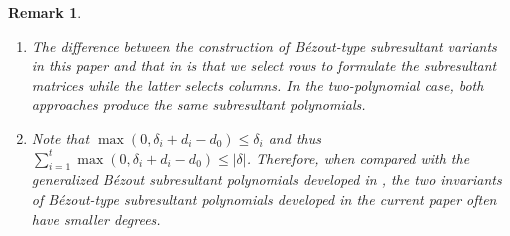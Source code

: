 \documentclass{article}
\newtheorem{remark}[theorem]{Remark}
\begin{document}
\begin{remark}\ 
\begin{enumerate}[(1)]
\item 
The difference between the construction of B\'ezout-type subresultant variants in this paper and that in \cite{diaz2004various} is that we select rows to formulate the subresultant matrices while the latter selects columns. In the two-polynomial case, both approaches produce the same subresultant polynomials. 
\item Note that $\max (0,{\delta _i} + {d_i} - {d_0})\le\delta_i $ and thus $\sum_{i = 1}^t {\max (0,{\delta _i} + {d_i} - {d_0})}\le|\delta|$. Therefore,  when compared with the generalized B\'ezout subresultant polynomials developed in \cite{hong2021subresultant},
the two invariants of B\'ezout-type subresultant polynomials developed in the current paper often have smaller degrees.
\end{enumerate}
\end{remark}
\end{document}
